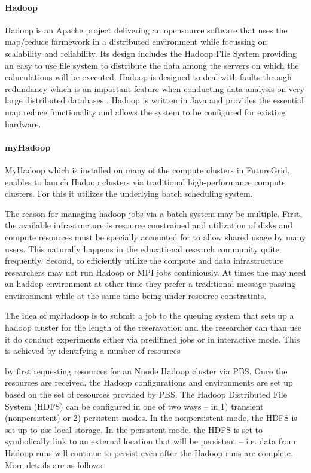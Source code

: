 \paragraph{Hadoop}\label{S:hadoop}

Hadoop \cite{report/myhadoop}\cite{myhadoop2} is an Apache project
delivering an opensource software that uses the map/reduce farmework
in a distributed environment while focussing on scalability and
reliability. Its design includes the Hadoop FIle System providing an
easy to use file system to distribute the data among the servers on
which the caluculations will be executed. Hadoop is designed to deal
with faults through redundancy which is an important feature when
conducting data analysis on very large distributed databases
\cite{www/hadoop}.  Hadoop is written in Java and provides the
essential map reduce functionality and allows the system to be
configured for existing hardware.

\paragraph{myHadoop}

MyHadoop which is installed on many of the compute clusters in
FutureGrid, enables to launch Hadoop clusters via traditional
high-performance compute clusters. For this it utilizes the underlying
batch scheduling system. 

The reason for managing hadoop jobs via a batch system may be
multiple. First, the available infrastructure is resource constrained
and utilization of disks and compute resources must be specially
accounted for to allow shared usage by many users. This naturally
happens in the educational research community quite frequently. 
Second, to efficiently utilize the compute and data infrastructure
researchers may not run Hadoop or MPI jobs continiously. At times the
may need an haddop environment at other time they prefer a traditional
message passing enviironment while at the same time being under
resource constratints.

The idea of myHadoop is to submit a job to the queuing system that
sets up a hadoop cluster for the length of the reseravation and the
researcher can than use it do conduct experiments either via
predifined jobs or in interactive mode. This is achieved by
identifying a number of resources 



by first requesting resources
for an Nnode Hadoop cluster via PBS. Once the resources are received, the Hadoop
configurations and environments are set up based on the set of resources provided by
PBS. The Hadoop Distributed File System (HDFS) can be configured in one of two ways
– in 1) transient (nonpersistent) or 2) persistent modes. In the nonpersistent mode, the
HDFS is set up to use local storage. In the persistent mode, the HDFS is set to
symbolically link to an external location that will be persistent – i.e. data from Hadoop
runs will continue to persist even after the Hadoop runs are complete. More details are as
follows.

